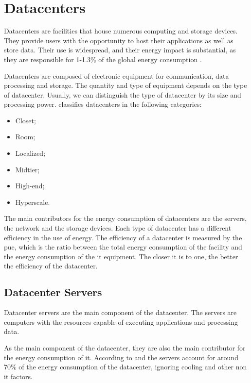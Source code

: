 \section{Datacenters}

Datacenters are facilities that house numerous computing and storage devices. They provide users with the opportunity to host their applications as well as store data. Their use is widespread, and their energy impact is substantial, as they are responsible for  1-1.3\% of the global energy consumption \cite{IEA}.

Datacenters are composed of electronic equipment for communication, data processing and storage. The quantity and type of equipment depends on the type of datacenter. Usually, we can distinguish the type of datacenter by its size and processing power. \citet{Shehabi2016} classifies datacenters in the following categories:

\begin{itemize}
    \item Closet;
    \item Room;
    \item Localized;
    \item Midtier;
    \item High-end;
    \item Hyperscale.
\end{itemize}

The main contributors for the energy consumption of datacenters are the servers, the network and the storage devices. Each type of datacenter has a different efficiency in the use of energy. The efficiency of a datacenter is measured by the \ac{pue}, which is the ratio between the total energy consumption of the facility and the energy consumption of the \ac{it} equipment. The closer it is to one, the better the efficiency of the datacenter.

\subsection{Datacenter Servers}

Datacenter servers are the main component of the datacenter. The servers are computers with the resources capable of executing applications and processing data.

As the main component of the datacenter, they are also the main contributor for the energy consumption of it. According to \citet{Cheung2018} and \citet{Dayarathna2016} the servers account for around 70\% of the energy consumption of the datacenter, ignoring cooling and other non \ac{it} factors.


